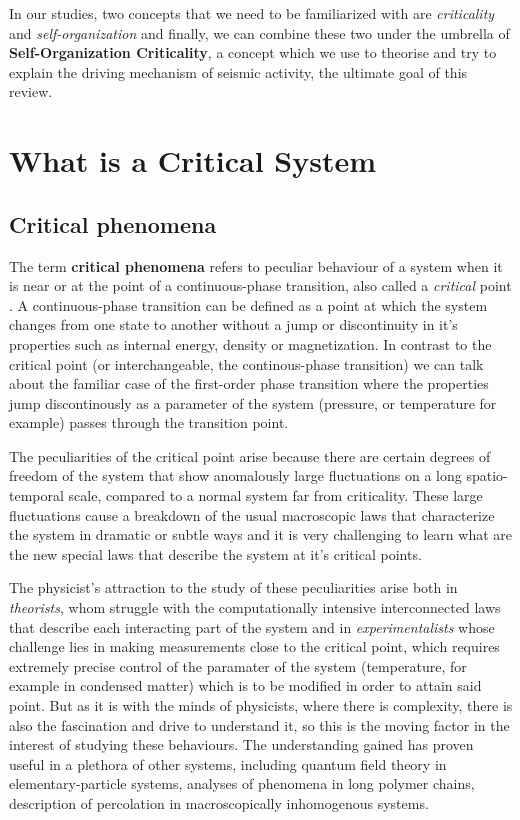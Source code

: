 In our studies, two concepts that we need to be familiarized with are {\it criticality} and {\it self-organization} and finally, we can combine these two under the umbrella of {\bf Self-Organization Criticality}, a concept which we use to theorise and try to explain the driving mechanism of seismic activity, the ultimate goal of this review.

\section{What is a Critical System}

\subsection{Critical phenomena}
The term {\bf critical phenomena} refers to peculiar behaviour of a system when it is near or at the point of a continuous-phase transition, also called a {\it critical} point \cite{NAP628}. A continuous-phase transition can be defined as a point at which the system changes from one state to another without a jump or discontinuity in it's properties such as internal energy, density or magnetization. In contrast to the critical point (or interchangeable, the continous-phase transition) we can talk about the familiar case of the first-order phase transition where the properties jump discontinously as a parameter of the system (pressure, or temperature for example) passes through the transition point.\par 

The peculiarities of the critical point arise because there are  certain degrees of freedom of the system that show anomalously large fluctuations on a long spatio-temporal scale, compared to a normal system far from criticality. These large fluctuations cause a breakdown of the usual macroscopic laws that characterize the system in dramatic or subtle ways and it is very challenging to learn what are the new special laws that describe the system at it's critical points.\par 

The physicist's attraction to the study of these peculiarities arise both in {\it theorists}, whom struggle with the computationally intensive interconnected laws that describe each interacting part of the system and in {\it experimentalists} whose challenge lies in making measurements close to the critical point, which requires extremely precise control of the paramater of the system (temperature, for example in condensed matter) which is to be modified in order to attain said point. But as it is with the minds of physicists, where there is complexity, there is also the fascination and drive to understand it, so this is the moving factor in the interest of studying these behaviours. The understanding gained has proven useful in a plethora of other systems, including quantum field theory in elementary-particle systems, analyses of phenomena in long polymer chains, description of percolation in macroscopically inhomogenous systems.

